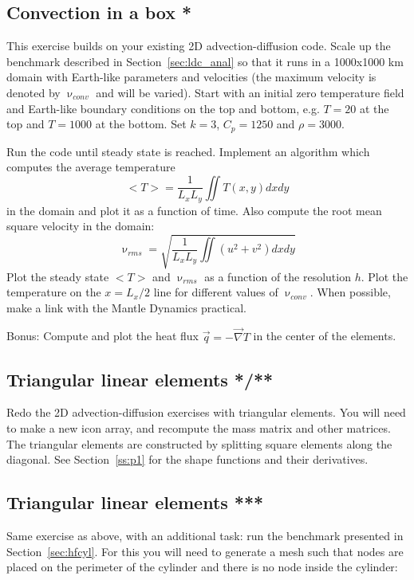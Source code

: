 

\subsection{Convection in a box *}

This exercise builds on your existing 2D advection-diffusion code. 
Scale up the benchmark described in Section~\ref{sec:ldc_anal} so that 
it runs in a 1000x1000 km domain with Earth-like parameters and velocities
(the maximum velocity is denoted by $\upnu_{conv}$ and will be varied).
Start with an initial zero temperature field and Earth-like boundary conditions 
on the top and bottom, e.g. $T=20$ at the top and $T=1000$ at the bottom. 
Set $k=3$, $C_p=1250$ and $\rho=3000$.

Run the code until steady state is reached. Implement an algorithm which computes the average 
temperature 
\[
<T> = \frac{1}{L_xL_y} \iint T(x,y) dx dy
\]
in the domain and plot it as a function of time.
Also compute the root mean square velocity in the domain:
\[
\upnu_{rms} = \sqrt{   \frac{1}{L_xL_y} \iint (u^2+v^2) dx dy  }
\]
Plot the steady state $<T>$ and $\upnu_{rms} $ as a function of the resolution $h$. 
Plot the temperature on the $x=L_x/2$ line for different values 
of $\upnu_{conv}$.
When possible, make a link with the Mantle Dynamics practical. 

Bonus: Compute and plot the heat flux $\vec{q}=-\vec\nabla T$ in the center of the elements.

\subsection{Triangular linear elements */**}

Redo the 2D advection-diffusion exercises with triangular elements.
You will need to make a new icon array, and recompute the mass matrix 
and other matrices. The triangular elements are constructed by splitting 
square elements along the diagonal.
See Section~\ref{ss:p1} for the shape functions and their derivatives. 

\subsection{Triangular linear elements ***}

Same exercise as above, with an additional task: run the benchmark
presented in Section~\ref{sec:hfcyl}.
For this you will need to generate a mesh 
such that nodes are placed on the perimeter of the cylinder and there is 
no node inside the cylinder:

